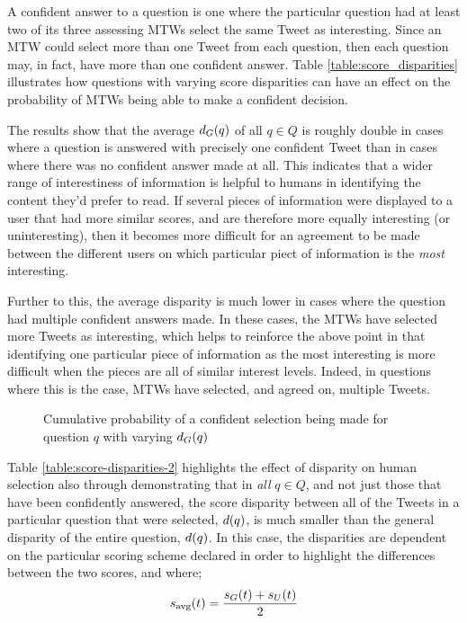A confident answer to a question is one where the particular question had at least two of its three assessing MTWs select the same Tweet as interesting. Since an MTW could select more than one Tweet from each question, then each question may, in fact, have more than one confident answer. Table \ref{table:score_disparities} illustrates how questions with varying score disparities can have an effect on the probability of MTWs being able to make a confident decision.

The results show that the average $d_G(q)$ of all $q \in Q$ is roughly double in cases where a question is answered with precisely one confident Tweet than in cases where there was no confident answer made at all. This indicates that a wider range of interestiness of information is helpful to humans in identifying the content they'd prefer to read. If several pieces of information were displayed to a user that had more similar scores, and are therefore more equally interesting (or uninteresting), then it becomes more difficult for an agreement to be made between the different users on which particular piect of information is the \textit{most} interesting.

Further to this, the average disparity is much lower in cases where the question had multiple confident answers made. In these cases, the MTWs have selected more Tweets as interesting, which helps to reinforce the above point in that identifying one particular piece of information as the most interesting is more difficult when the pieces are all of similar interest levels. Indeed, in questions where this is the case, MTWs have selected, and agreed on, multiple Tweets. 

 \begin{figure}[h]
\centering
{}
\caption{Cumulative probability of a confident selection being made for question $q$ with varying $d_G(q)$}
\label{fig:cum-question-disparity}
\end{figure}

Table \ref{table:score-disparities-2} highlights the effect of disparity on human selection also through demonstrating that in \textit{all} $q \in Q$, and not just those that have been confidently answered, the score disparity between all of the Tweets in a particular question that were selected, $d(q)$, is much smaller than the general disparity of the entire question, $d(q)$. In this case, the disparities are dependent on the particular scoring scheme declared in order to highlight the differences between the two scores, and where;
\[
    s_{\textrm{avg}}(t) = \frac{s_G(t) + s_U(t)}{2}
\] 

